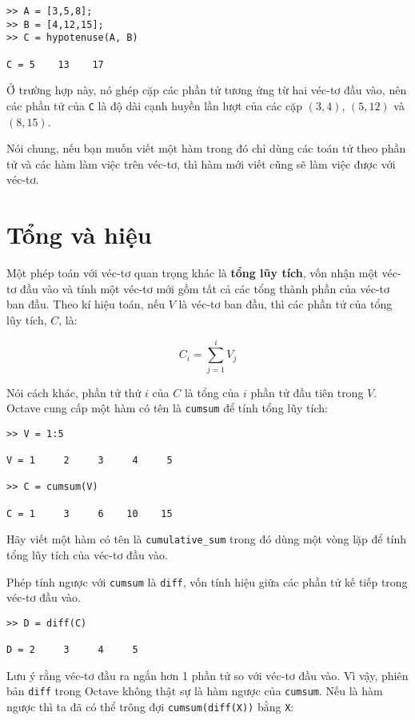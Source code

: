\documentclass[12pt]{book}
\begin{document}
\begin{verbatim}
>> A = [3,5,8];
>> B = [4,12,15];
>> C = hypotenuse(A, B)

C = 5    13    17
\end{verbatim}
Ở trường hợp này, nó ghép cặp các phần tử tương ứng từ hai
véc-tơ đầu vào, nên các phần tử của {\tt C} là độ dài cạnh huyền
lần lượt của các cặp $(3,4)$, $(5,12)$ và $(8,15)$.

Nói chung, nếu bạn muốn viết một hàm trong đó chỉ dùng các toán tử
theo phần tử và các hàm làm việc trên véc-tơ, thì hàm mới viết cũng
sẽ làm việc được với véc-tơ.


\section{Tổng và hiệu}

Một phép toán với véc-tơ quan trọng khác là {\bf tổng lũy tích}, vốn
nhận một véc-tơ đầu vào và tính một véc-tơ mới gồm tất cả các tổng
thành phần của véc-tơ ban đầu. Theo kí hiệu toán, nếu $V$ là véc-tơ
ban đầu, thì các phần tử của tổng lũy tích, $C$, là:

\[ C_i = \sum_{j=1}^i V_j \]

Nói cách khác, phần tử thứ $i$ của $C$ là tổng của 
$i$ phần tử đầu tiên trong $V$.  Octave cung cấp một hàm có tên
là {\tt cumsum} để tính tổng lũy tích:

\begin{verbatim}
>> V = 1:5

V = 1     2     3     4     5

>> C = cumsum(V)

C = 1     3     6    10    15
\end{verbatim}
%
\begin{ex}
Hãy viết một hàm có tên là \verb#cumulative_sum# trong đó dùng
một vòng lặp để tính tổng lũy tích của véc-tơ đầu vào.
\end{ex}

Phép tính ngược với {\tt cumsum} là {\tt diff}, vốn tính hiệu giữa
các phần tử kế tiếp trong véc-tơ đầu vào.

\begin{verbatim}
>> D = diff(C)

D = 2     3     4     5
\end{verbatim}
%
Lưu ý rằng véc-tơ đầu ra ngắn hơn 1 phần tử so với véc-tơ đầu vào.
Vì vậy, phiên bản {\tt diff} trong Octave không thật sự là hàm ngược
của {\tt cumsum}. Nếu là hàm ngược thì ta đã có thể trông đợi 
{\tt cumsum(diff(X))} bằng {\tt X}:
\end{document}
